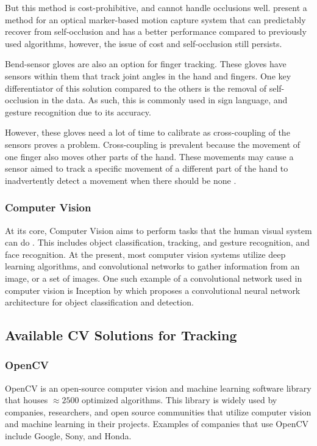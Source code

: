 \documentclass{report}
\begin{document}
But this method is cost-prohibitive, and cannot handle occlusions well.
\citeauthor{alexanderson2016} present a method for an optical marker-based
motion capture system that can predictably recover from self-occlusion and has a
better performance compared to previously used algorithms, however, the issue of
cost and self-occlusion still persists.

Bend-sensor gloves are also an option for finger tracking. These gloves have
sensors within them that track joint angles in the hand and fingers. One key
differentiator of this solution compared to the others is the removal of
self-occlusion in the data. As such, this is commonly used in sign language, and
gesture recognition due to its accuracy.

However, these gloves need a lot of time to calibrate as cross-coupling of the
sensors proves a problem. Cross-coupling is prevalent because the movement of
one finger also moves other parts of the hand. These movements may cause a
sensor aimed to track a specific movement of a different part of the hand to
inadvertently detect a movement when there should be none
\parencite{wheatland2015}.

\subsubsection{Computer Vision}

At its core, Computer Vision aims to perform tasks that the human visual system
can do \parencite{cern}. This includes object classification, tracking, and
gesture recognition, and face recognition. At the present, most computer vision
systems utilize deep learning algorithms, and convolutional networks to gather
information from an image, or a set of images. One such example of a
convolutional network used in computer vision is Inception by
\citeauthor{szegedy2015} which proposes a convolutional neural network
architecture for object classification and detection.

\subsection{Available CV Solutions for Tracking}

\subsubsection{OpenCV}

OpenCV is an open-source computer vision and machine learning software library
that houses ${\approx2500}$ optimized algorithms. This library is widely used by
companies, researchers, and open source communities that utilize computer vision
and machine learning in their projects. Examples of companies that use OpenCV
include Google, Sony, and Honda.
\end{document}
